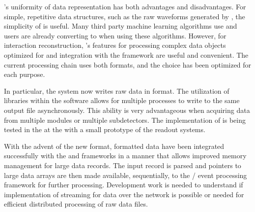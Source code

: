 \documentclass[../main-v1.tex]{subfiles}
\begin{document}
's uniformity of data representation has both advantages and disadvantages. For simple, repetitive data structures, such as the raw waveforms generated by , the simplicity of  is useful.  Many third party machine learning algorithms use  and users are already converting  to  when using these algorithms.  However, for interaction reconstruction, 's features for processing complex data objects optimized for  and integration with the  framework are useful and convenient.  The current  processing chain uses both formats, and the choice has been optimized for each purpose.

In particular, the   system now writes raw data in  format. The utilization of  libraries within the  software allows for multiple processes to write to the same output file asynchronously. This ability is very advantageous when acquiring data from multiple  modules or multiple  subdetectors. The implementation of  is being tested %
in the  \coldbox at the  with a small prototype of the %
  readout systems. 

With the advent of the new  format,  formatted data have been integrated successfully with the  and  frameworks in a manner that allows improved memory management for large data records.  The  input  record is parsed and pointers to large data arrays are then made available, sequentially, to the / event processing framework for further processing. Development work is needed to understand if implementation of streaming for  data over the network is possible or needed for efficient distributed processing of raw data files.
\end{document}
